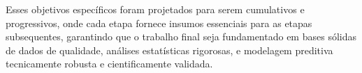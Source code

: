 Esses objetivos específicos foram projetados para serem cumulativos e progressivos, onde cada etapa fornece insumos essenciais para as etapas subsequentes, garantindo que o trabalho final seja fundamentado em bases sólidas de dados de qualidade, análises estatísticas rigorosas, e modelagem preditiva tecnicamente robusta e cientificamente validada.
